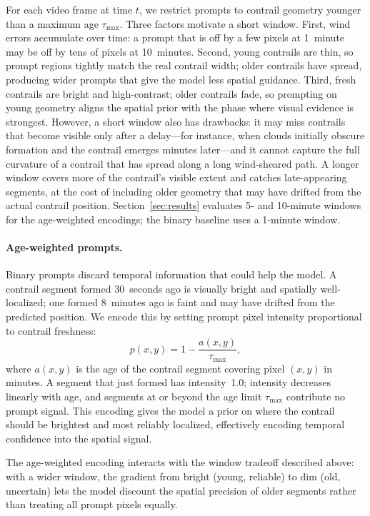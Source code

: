 \documentclass[review]{elsarticle}
\begin{document}
For each video frame at time $t$, we restrict prompts to contrail geometry younger than a maximum age $\tau_\text{max}$. Three factors motivate a short window. First, wind errors accumulate over time: a prompt that is off by a few pixels at 1~minute may be off by tens of pixels at 10~minutes. Second, young contrails are thin, so prompt regions tightly match the real contrail width; older contrails have spread, producing wider prompts that give the model less spatial guidance. Third, fresh contrails are bright and high-contrast; older contrails fade, so prompting on young geometry aligns the spatial prior with the phase where visual evidence is strongest. However, a short window also has drawbacks: it may miss contrails that become visible only after a delay---for instance, when clouds initially obscure formation and the contrail emerges minutes later---and it cannot capture the full curvature of a contrail that has spread along a long wind-sheared path. A longer window covers more of the contrail's visible extent and catches late-appearing segments, at the cost of including older geometry that may have drifted from the actual contrail position. Section~\ref{sec:results} evaluates 5- and 10-minute windows for the age-weighted encodings; the binary baseline uses a 1-minute window.

\paragraph{Age-weighted prompts.} Binary prompts discard temporal information that could help the model. A contrail segment formed 30~seconds ago is visually bright and spatially well-localized; one formed 8~minutes ago is faint and may have drifted from the predicted position. We encode this by setting prompt pixel intensity proportional to contrail freshness:
\begin{equation}
    p(x, y) = 1 - \frac{a(x,y)}{\tau_\text{max}},
\label{eq:age_prompt}
\end{equation}
where $a(x,y)$ is the age of the contrail segment covering pixel $(x,y)$ in minutes. A segment that just formed has intensity~1.0; intensity decreases linearly with age, and segments at or beyond the age limit $\tau_\text{max}$ contribute no prompt signal. This encoding gives the model a prior on where the contrail should be brightest and most reliably localized, effectively encoding temporal confidence into the spatial signal.

The age-weighted encoding interacts with the window tradeoff described above: with a wider window, the gradient from bright (young, reliable) to dim (old, uncertain) lets the model discount the spatial precision of older segments rather than treating all prompt pixels equally.
\end{document}
